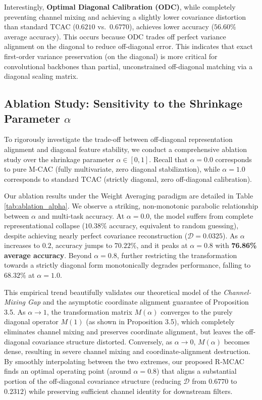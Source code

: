 \documentclass{article}
\theoremstyle{plain}
\theoremstyle{definition}
\theoremstyle{remark}
\begin{document}
Interestingly, \textbf{Optimal Diagonal Calibration (ODC)}, while completely preventing channel mixing and achieving a slightly lower covariance distortion than standard TCAC ($0.6210$ vs.\ $0.6770$), achieves lower accuracy ($56.60\%$ average accuracy). This occurs because ODC trades off perfect variance alignment on the diagonal to reduce off-diagonal error. This indicates that exact first-order variance preservation (on the diagonal) is more critical for convolutional backbones than partial, unconstrained off-diagonal matching via a diagonal scaling matrix.

\subsection{Ablation Study: Sensitivity to the Shrinkage Parameter \(\alpha\)}
To rigorously investigate the trade-off between off-diagonal representation alignment and diagonal feature stability, we conduct a comprehensive ablation study over the shrinkage parameter $\alpha \in [0, 1]$. Recall that $\alpha = 0.0$ corresponds to pure M-CAC (fully multivariate, zero diagonal stabilization), while $\alpha = 1.0$ corresponds to standard TCAC (strictly diagonal, zero off-diagonal calibration). 

Our ablation results under the Weight Averaging paradigm are detailed in Table \ref{tab:ablation_alpha}. We observe a striking, non-monotonic parabolic relationship between $\alpha$ and multi-task accuracy. At $\alpha = 0.0$, the model suffers from complete representational collapse ($10.38\%$ accuracy, equivalent to random guessing), despite achieving nearly perfect covariance reconstruction ($\mathcal{D} = 0.0325$). As $\alpha$ increases to $0.2$, accuracy jumps to $70.22\%$, and it peaks at $\alpha = 0.8$ with \textbf{76.86\% average accuracy}. Beyond $\alpha = 0.8$, further restricting the transformation towards a strictly diagonal form monotonically degrades performance, falling to $68.32\%$ at $\alpha = 1.0$.

This empirical trend beautifully validates our theoretical model of the \textit{Channel-Mixing Gap} and the asymptotic coordinate alignment guarantee of Proposition 3.5. As $\alpha \to 1$, the transformation matrix $M(\alpha)$ converges to the purely diagonal operator $M(1)$ (as shown in Proposition 3.5), which completely eliminates channel mixing and preserves coordinate alignment, but leaves the off-diagonal covariance structure distorted. Conversely, as $\alpha \to 0$, $M(\alpha)$ becomes dense, resulting in severe channel mixing and coordinate-alignment destruction. By smoothly interpolating between the two extremes, our proposed R-MCAC finds an optimal operating point (around $\alpha = 0.8$) that aligns a substantial portion of the off-diagonal covariance structure (reducing $\mathcal{D}$ from $0.6770$ to $0.2312$) while preserving sufficient channel identity for downstream filters.
\end{document}
